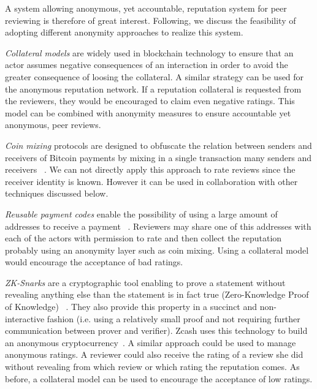 A system allowing anonymous, yet accountable, reputation system for peer
reviewing is therefore of great interest. Following, we discuss the feasibility
of adopting different anonymity approaches to realize this system.

\emph{Collateral models} are widely used in blockchain technology to ensure that
an actor assumes negative consequences of an interaction in order to avoid the
greater consequence of loosing the collateral. A similar strategy can be used
for the anonymous reputation network. If a reputation collateral is requested
from the reviewers, they would be encouraged to claim even negative ratings.
This model can be combined with anonymity measures to ensure accountable yet
anonymous, peer reviews.

\emph{Coin mixing} protocols are designed to obfuscate the relation between
senders and receivers of Bitcoin payments by mixing in a single transaction many
senders and receivers ~\cite{meiklejohn2015privacy}. We can not directly apply
this approach to rate reviews since the receiver identity is known. However it
can be used in collaboration with other techniques discussed below.

\emph{Reusable payment codes} enable the possibility of using a large amount of
addresses to receive a payment ~\cite{harrigan2016unreasonable,
  ranvierReusable}. Reviewers may share one of this addresses with each of the
actors with permission to rate and then collect the reputation probably using an
anonymity layer such as coin mixing. Using a collateral model would encourage
the acceptance of bad ratings.

\emph{ZK-Snarks} are a cryptographic tool enabling to prove a statement without
revealing anything else than the statement is in fact true (Zero-Knowledge Proof
of Knowledge) ~\cite{blum1988non,bitansky2013succinct}. They also provide this
property in a succinct and non-interactive fashion (i.e. using a relatively
small proof and not requiring further communication between prover and
verifier). Zcash uses this technology to build an anonymous
cryptocurrency~\cite{sasson2014zerocash}. A similar approach could be used to
manage anonymous ratings. A reviewer could also receive the rating of a review
she did without revealing from which review or which rating the reputation
comes. As before, a collateral model can be used to encourage the acceptance of
low ratings.


